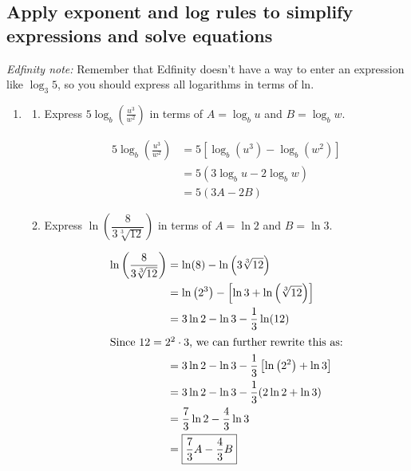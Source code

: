 \documentclass{article}
\theoremstyle{theorem}
\begin{document}
\subsection*{Apply exponent and log rules to simplify expressions and solve equations}

\emph{Edfinity note:} Remember that Edfinity doesn't have a way to enter an expression like $\log_3 5$, so you should express all logarithms in terms of ln. 

\begin{enumerate}[resume]
\item 

  \begin{enumerate}
  \item
    \begin{problem}
      Express $\displaystyle 5 \log_b \left( \frac{u^3}{w^2} \right)$ in terms of $A = \log_b u$ and $B = \log_b w$.
    \end{problem}

    \begin{solution}
      \begin{align*}
        5 \log_b \left( \frac{u^3}{w^2} \right) &= 5 \left[ \log_b \left( u^3 \right) - \log_b \left( w^2 \right) \right] \\
        &= 5 (3 \log_b u - 2 \log_b w) \\
        &= \boxed{5(3A - 2 B)}
      \end{align*}
    \end{solution}

  \item
    \begin{problem}
      Express $\displaystyle \ln \left( \dfrac{8}{3 \sqrt[3]{12}} \right)$ in terms of $A = \ln 2$ and $B = \ln 3$. 
    \end{problem}

    \begin{solution}
      \begin{align*}
        \ln \left( \dfrac{8}{3 \sqrt[3]{12}} \right) &= \ln (8) - \ln \left(3 \sqrt[3]{12} \right) \\
        &= \ln \left( 2^3 \right) - \left[ \ln 3 + \ln \left( \sqrt[3]{12} \right) \right] \\
        &= 3 \ln 2 - \ln 3 - \frac{1}{3} \ln (12) \\
        \intertext{Since $12 = 2^2 \cdot 3$, we can further rewrite this as:}
        &= 3 \ln 2 - \ln 3 - \frac{1}{3} \left[ \ln \left( 2^2 \right) + \ln 3 \right] \\
        &= 3 \ln 2 - \ln 3 - \frac{1}{3} (2 \ln 2 + \ln 3) \\
        &= \frac{7}{3} \ln 2 - \frac{4}{3} \ln 3 \\
        &= \boxed{\frac{7}{3} A - \frac{4}{3} B}
      \end{align*}
    \end{solution}
  \end{enumerate}


\end{enumerate}
\end{document}
